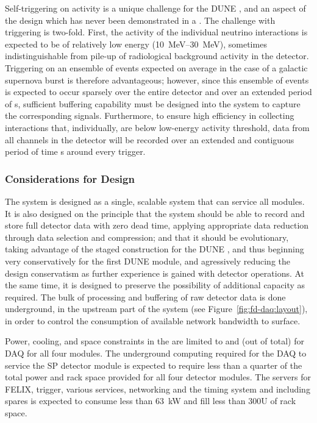 Self-triggering on  activity is a unique challenge for the
DUNE , and an aspect of the design which has never been demonstrated
in a . The challenge with  triggering is two-fold. 
First, the activity of the individual  neutrino interactions
is expected to be of relatively low energy (\SIrange{10}{30}{\mega\electronvolt}),
sometimes indistinguishable from pile-up of radiological background activity in the
detector.  Triggering on an ensemble of  events expected on
average in the case of a galactic supernova burst is therefore
advantageous; however, since this ensemble of events is expected to occur sparsely over the
entire detector and over an extended period of \si{s},
sufficient buffering capability must be designed into the system to
capture the corresponding signals. 
Furthermore, to ensure high efficiency in collecting  interactions
that, individually, are below low-energy activity threshold, data from
all channels in the detector will be recorded over an extended and contiguous period of
time \si{s} around every  trigger.

 

\subsubsection{Considerations for Design}
\label{sec:fd-daq:considerations}

The  system is designed as a single, scalable system that can service
all  modules. It is also designed on the principle that the system should be
able to record and store full detector data with zero dead time, applying appropriate data reduction through data selection and compression; and
that it should be evolutionary, taking advantage of the staged
construction for the DUNE , and thus beginning very conservatively
for the first DUNE  module, and agressively reducing the design
conservatism as further experience is gained with detector
operations. At the same time, it is designed to preserve the possibility of additional capacity
as required. The bulk of processing and buffering of raw detector data is
done underground, in the upstream  part of the system (see Figure~\ref{fig:fd-daq:layout}), in order to
control the consumption of available network bandwidth to surface.

Power, cooling, and space constraints in the  are limited to \daqpower and \daqracks (out of \cucracks total) for DAQ for all four  modules.
The underground computing required for the DAQ to service the SP detector module is expected to require less than a quarter of the total power and rack space provided for all four detector modules. 
The servers for FELIX, trigger, various services, networking and the timing system and including spares is expected to consume less than \SI{63}{\kilo\watt} and fill less than 300U of rack space.

